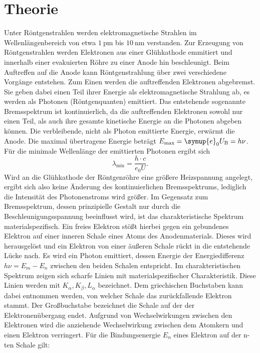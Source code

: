 \section{Theorie}
\label{sec:Theorie}
Unter Röntgenstrahlen werden elektromagnetische Strahlen im Wellenlängenbereich von etwa $\SI{1}{\pico\meter}$ bis $\SI{10}{\nano\meter}$ verstanden.
Zur Erzeugung von Röntgenstrahlen werden Elektronen aus einer Glühkathode emmitiert und innerhalb einer evakuierten Röhre zu einer Anode hin beschleunigt.
Beim Auftreffen auf die Anode kann Röntgenstrahlung über zwei verschiedene Vorgänge entstehen.
Zum Einen werden die auftreffenden Elektronen abgebremst. Sie geben dabei einen Teil ihrer Energie als elektromagnetische Strahlung ab, es werden als Photonen (Röntgenquanten) emittiert.
Das entstehende sogenannte Bremsspektrum ist kontinuierlich, da die auftreffenden Elektronen sowohl nur einen Teil, als auch ihre gesamte kinetische Energie an die Photonen abgeben können. Die verbleibende, nicht als Photon emittierte Energie, erwärmt die Anode.
Die maximal übertragene Energie beträgt $E_\mathrm{max}=\symup{e}_0U_\mathrm{B}=h\nu$.
Für die minimale Wellenlänge der emittierten Photonen ergibt sich
\begin{equation}
  \lambda_\mathrm{min}=\frac{h\cdot c}{e_0U} \text{.}
\end{equation}
Wird an die Glühkathode der Röntgenröhre eine größere Heizspannung angelegt, ergibt sich also keine Änderung des kontinuierlichen Bremsspektrums, lediglich die Intensität des Photonenstroms wird größer.
Im Gegensatz zum Bremsspektrum, dessen prinzipielle Gestalt nur durch die Beschleunigungsspannung beeinflusst wird, ist das charakteristische Spektrum materialspezifisch.
Ein freies Elektron stößt hierbei gegen ein gebundenes Elektron auf einer inneren Schale eines Atoms des Anodenmaterials.
Dieses wird herausgelöst und ein Elektron von einer äußeren Schale rückt in die entstehende Lücke nach. Es wird ein Photon emittiert, dessen Energie der Energiedifferenz $h\nu=E_m-E_n$ zwischen den beiden Schalen entspricht.
Im charakteristischen Spektrum zeigen sich scharfe Linien mit materialspezifischer Charakteristik.
Diese Linien werden mit $K_\alpha,K_\beta,L_\alpha$ bezeichnet. Dem griechischen Buchstaben kann dabei entnommen werden, von welcher Schale das zurückfallende Elektron
stammt. Der Großbuchstabe bezeichnet die Schale auf der der Elektronenübergang endet.
Aufgrund von Wechselwirkungen zwischen den Elektronen wird die anziehende Wechselwirkung zwischen dem Atomkern und einen Elektron verringert.
Für  die Bindungsenergie $E_n$ eines Elektron auf der n-ten Schale gilt:
